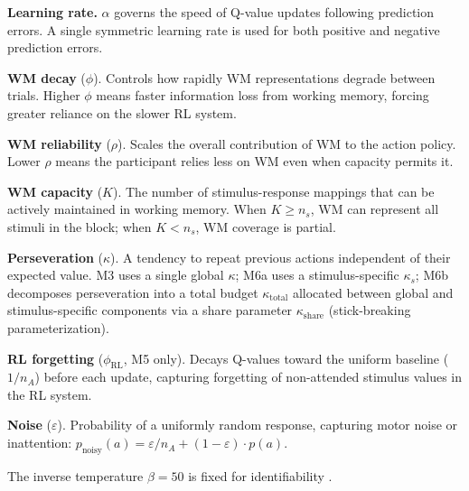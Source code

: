 \documentclass{article}
\begin{document}
\begin{tcolorbox}[enhanced jigsaw, arc=.35mm, bottomrule=.15mm, bottomtitle=1mm, breakable, colback=white, colbacktitle=quarto-callout-note-color!10!white, colframe=quarto-callout-note-color-frame, coltitle=black, left=2mm, leftrule=.75mm, opacityback=0, opacitybacktitle=0.6, rightrule=.15mm, title=\textcolor{quarto-callout-note-color}{\faInfo}\hspace{0.5em}{Model Parameter Glossary}, titlerule=0mm, toprule=.15mm, toptitle=1mm]

\textbf{Learning rate.} \(\alpha\) governs the speed of Q-value updates
following prediction errors. A single symmetric learning rate is used
for both positive and negative prediction errors.

\textbf{WM decay} (\(\phi\)). Controls how rapidly WM representations
degrade between trials. Higher \(\phi\) means faster information loss
from working memory, forcing greater reliance on the slower RL system.

\textbf{WM reliability} (\(\rho\)). Scales the overall contribution of
WM to the action policy. Lower \(\rho\) means the participant relies
less on WM even when capacity permits it.

\textbf{WM capacity} (\(K\)). The number of stimulus-response mappings
that can be actively maintained in working memory. When \(K \geq n_s\),
WM can represent all stimuli in the block; when \(K < n_s\), WM coverage
is partial.

\textbf{Perseveration} (\(\kappa\)). A tendency to repeat previous
actions independent of their expected value. M3 uses a single global
\(\kappa\); M6a uses a stimulus-specific \(\kappa_s\); M6b decomposes
perseveration into a total budget \(\kappa_{\text{total}}\) allocated
between global and stimulus-specific components via a share parameter
\(\kappa_{\text{share}}\) (stick-breaking parameterization).

\textbf{RL forgetting} (\(\phi_{\text{RL}}\), M5 only). Decays Q-values
toward the uniform baseline (\(1/n_A\)) before each update, capturing
forgetting of non-attended stimulus values in the RL system.

\textbf{Noise} (\(\varepsilon\)). Probability of a uniformly random
response, capturing motor noise or inattention:
\(p_{\text{noisy}}(a) = \varepsilon / n_A + (1 - \varepsilon) \cdot p(a)\).

The inverse temperature \(\beta = 50\) is fixed for identifiability
\citep{senta2025}.

\end{tcolorbox}
\end{document}
